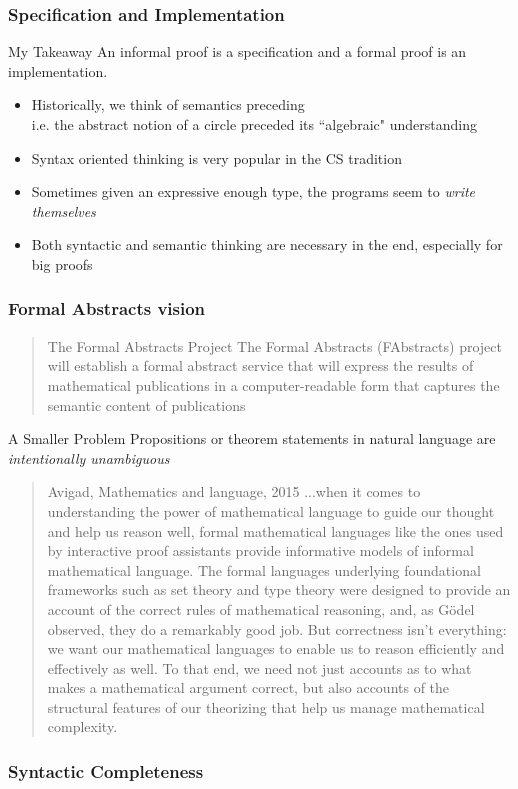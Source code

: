 \documentclass[9pt]{beamer}
\begin{document}
\begin{frame}
\frametitle{Specification and Implementation}

\begin{alertblock}{My Takeaway}
  An informal proof is a specification and a formal proof is an implementation.
\end{alertblock}

\begin{itemize}
\item Historically, we think of semantics preceding\\
  i.e. the abstract notion of a circle preceded its ``algebraic" understanding
\item Syntax oriented thinking is very popular in the CS tradition
\item Sometimes given an expressive enough type, the programs seem to \emph{write themselves}
\item Both syntactic and semantic thinking are necessary in the end, especially for big proofs

\end{itemize}
\end{frame}

\begin{frame}
\frametitle{Formal Abstracts vision}

\begin{quote}{The Formal Abstracts Project}
The Formal Abstracts (FAbstracts) project will establish a formal abstract service that will express the results of mathematical publications in a computer-readable form that captures the semantic content of publications
\end{quote}

\begin{alertblock}{A Smaller Problem}
Propositions or theorem statements in natural language are \emph{intentionally unambiguous}
\end{alertblock}
\end{frame}

\begin{frame}
\begin{quote}{Avigad, Mathematics and language, 2015}
...when it comes to understanding the power of mathematical language to guide
our thought and help us reason well, formal mathematical languages like the ones
used by interactive proof assistants provide informative models of informal
mathematical language. The formal languages underlying foundational frameworks
such as set theory and type theory were designed to provide an account of the
correct rules of mathematical reasoning, and, as Gödel observed, they do a
remarkably good job. But correctness isn’t everything: we want our mathematical
languages to enable us to reason efficiently and effectively as well. To that
end, we need not just accounts as to what makes a mathematical argument correct,
but also accounts of the structural features of our theorizing that help us
manage mathematical complexity.
\end{quote}
\end{frame}
\frametitle{Syntactic Completeness}
\end{document}

